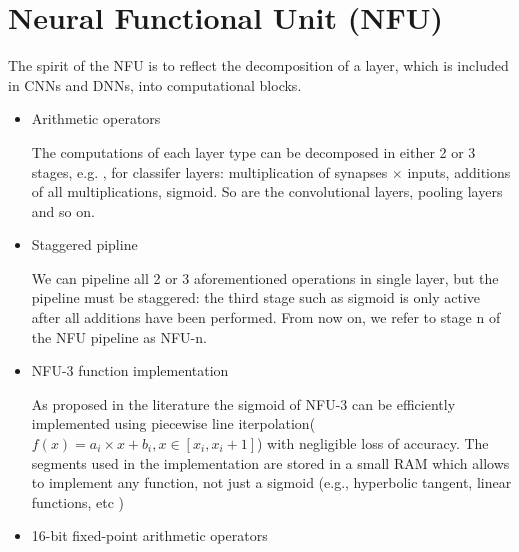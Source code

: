 \documentclass[10pt]{article}
\begin{document}
    \section{Neural Functional Unit (NFU)}
    The spirit of the NFU is to reflect the decomposition of a layer,
    which is included in CNNs and DNNs, into computational blocks.
    \begin{itemize}
        \item Arithmetic operators

        The computations of each layer type can be decomposed in
        either 2 or 3 stages, e.g. , for classifer layers: 
        multiplication of synapses $\times$ inputs, additions of
        all multiplications, sigmoid. So are the convolutional
        layers, pooling layers and so on.
        \item Staggered pipline

        We can pipeline all 2 or 3 aforementioned operations in
        single layer, but the pipeline must be staggered: the third
        stage such as sigmoid is only active after all additions have 
        been performed. From now on, we refer to stage n of the NFU
        pipeline as NFU-n.
        \item NFU-3 function implementation

        As proposed in the literature 
        the sigmoid of NFU-3 can be efficiently implemented using
        piecewise line iterpolation($f(x) = a_i \times x + b_i, x
        \in [x_i, x_i + 1 ]$) with negligible loss of accuracy.
        The segments used in the implementation are stored in a
        small RAM which allows to implement any function, not just
        a sigmoid (e.g., hyperbolic tangent, linear functions, etc
        )
        \item 16-bit fixed-point arithmetic operators


\end{itemize}
\end{document}

